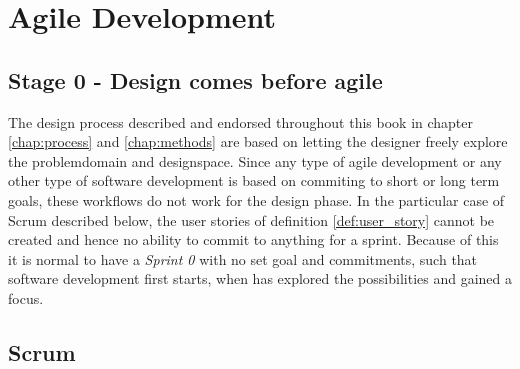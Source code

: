 \section{Agile Development} \label{sec:agile_development}

\begin{concept} \label{conc:agile} 
  
\end{concept}

\subsection{Stage 0 - Design comes before agile} \label{sec:design_before_agile}
The design process described and endorsed throughout this book in chapter \ref{chap:process} and \ref{chap:methods} are based on letting the designer freely explore the problemdomain and designspace. Since any type of agile development or any other type of software development is based on commiting to short or long term goals, these workflows do not work for the design phase. In the particular case of Scrum described below, the user stories of definition \ref{def:user_story} cannot be created and hence no ability to commit to anything for a sprint. Because of this it is normal to have a \emph{Sprint 0} with no set goal and commitments, such that software development first starts, when has explored the possibilities and gained a focus. \cite[p. 27]{beyer}

\subsection{Scrum} \label{sec:scrum} 

\begin{definition} \label{def:user_story} 
  
\end{definition}

\begin{definition} \label{def:product_owner} 

\end{definition}

\begin{definition} \label{def:scrum_master} 

\end{definition}

\begin{definition} \label{def:product_backlog} 

\end{definition}

